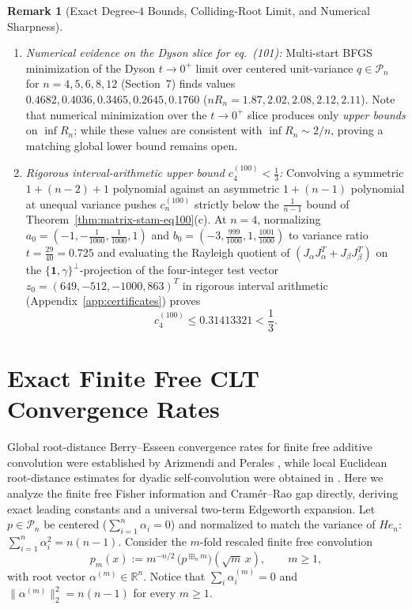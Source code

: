 \documentclass[11pt,a4paper]{article}
\theoremstyle{definition}
\newtheorem{remark}[theorem]{Remark}
\newcommand{\R}{\mathbb{R}}
\newcommand{\boxplusn}{\boxplus_n}
\newcommand{\one}{\mathbf{1}}
\begin{document}
\begin{remark}[Exact Degree-$4$ Bounds, Colliding-Root Limit, and Numerical Sharpness]
\begin{enumerate}
\[\]
($\frac{2}{3}, \frac{1}{2}, \frac{2}{5}$ for $n = 4, 5, 6$), explaining the slightly higher values $0.6667, 0.5015, 0.4039$ observed for arithmetic-progression micro-clusters.
\item[(iii)] \emph{Numerical evidence on the Dyson slice for eq.~(101):} Multi-start BFGS minimization of the Dyson $t \to 0^+$ limit over centered unit-variance $q \in \mathcal{P}_n$ for $n = 4, 5, 6, 8, 12$ (Section~7) finds values $0.4682, 0.4036, 0.3465, 0.2645, 0.1760$ ($n R_n = 1.87, 2.02, 2.08, 2.12, 2.11$). Note that numerical minimization over the $t \to 0^+$ slice produces only \emph{upper bounds} on $\inf R_n$; while these values are consistent with $\inf R_n \sim 2/n$, proving a matching global lower bound remains open.
\item[(iv)] \emph{Rigorous interval-arithmetic upper bound $c_4^{(100)} < \frac{1}{3}$:} Convolving a symmetric $1 + (n-2) + 1$ polynomial against an asymmetric $1 + (n-1)$ polynomial at unequal variance pushes $c_n^{(100)}$ strictly below the $\frac{1}{n-1}$ bound of Theorem~\ref{thm:matrix-stam-eq100}(c). At $n = 4$, normalizing $a_0 = (-1, -\frac{1}{1000}, \frac{1}{1000}, 1)$ and $b_0 = (-3, \frac{999}{1000}, 1, \frac{1001}{1000})$ to variance ratio $t = \frac{29}{40} = 0.725$ and evaluating the Rayleigh quotient of $(J_\alpha J_\alpha^T + J_\beta J_\beta^T)$ on the $\{\one, \gamma\}^\perp$-projection of the four-integer test vector $z_0 = (649, -512, -1000, 863)^T$ in rigorous interval arithmetic (Appendix~\ref{app:certificates}) proves
\[
c_4^{(100)} \le 0.31413321 < \frac{1}{3}.
\]
\end{enumerate}
\end{remark}

\section{Exact Finite Free CLT Convergence Rates}

Global root-distance Berry--Esseen convergence rates for finite free additive convolution were established by Arizmendi and Perales \cite{AP2020}, while local Euclidean root-distance estimates for dyadic self-convolution were obtained in \cite{HH2026}. Here we analyze the finite free Fisher information and Cram\'er--Rao gap directly, deriving exact leading constants and a universal two-term Edgeworth expansion. Let $p \in \mathcal{P}_n$ be centered ($\sum_{i=1}^n \alpha_i = 0$) and normalized to match the variance of $He_n$: $\sum_{i=1}^n \alpha_i^2 = n(n-1)$. Consider the $m$-fold rescaled finite free convolution
\[
p_m(x) := m^{-n/2}\, \big(p^{\boxplusn m}\big)(\sqrt{m}\,x), \qquad m \ge 1,
\]
with root vector $\alpha^{(m)} \in \R^n$. Notice that $\sum_i \alpha^{(m)}_i = 0$ and $\|\alpha^{(m)}\|_2^2 = n(n-1)$ for every $m \ge 1$.
\end{document}
